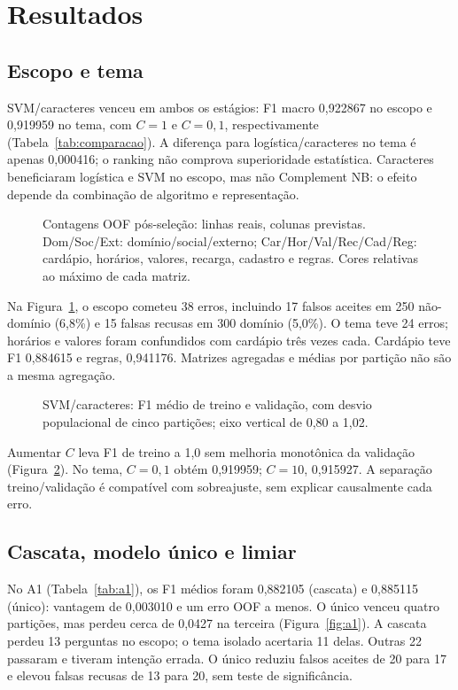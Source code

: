 \documentclass[12pt]{article}
\begin{document}
\section{Resultados}
\subsection{Escopo e tema}
SVM/caracteres venceu em ambos os estágios: F1 macro 0,922867 no escopo e
0,919959 no tema, com \(C=1\) e \(C=0{,}1\), respectivamente
(Tabela~\ref{tab:comparacao}). A diferença para logística/caracteres no tema é
apenas 0,000416; o ranking não comprova superioridade estatística.
Caracteres beneficiaram logística e SVM no escopo, mas não Complement NB:
o efeito depende da combinação de algoritmo e representação.


\begin{figure}[!htb]
\centering

\caption{Contagens OOF pós-seleção: linhas reais, colunas previstas.
Dom/Soc/Ext: domínio/social/externo; Car/Hor/Val/Rec/Cad/Reg: cardápio,
horários, valores, recarga, cadastro e regras. Cores relativas ao máximo de cada matriz.}
\label{fig:matrizes}
\end{figure}
Na Figura~\ref{fig:matrizes}, o escopo cometeu 38 erros, incluindo 17 falsos aceites em 250 não-domínio
(6,8\%) e 15 falsas recusas em 300 domínio (5,0\%). O tema teve 24 erros;
horários e valores foram confundidos com cardápio três vezes cada.
Cardápio teve F1 0,884615 e regras, 0,941176. Matrizes agregadas e médias
por partição não são a mesma agregação.

\begin{figure}[!htb]
\centering

\caption{SVM/caracteres: F1 médio de treino e validação, com desvio populacional
de cinco partições; eixo vertical de 0,80 a 1,02.}
\label{fig:curvas}
\end{figure}
Aumentar \(C\) leva F1 de treino a 1,0 sem melhoria monotônica da validação
(Figura~\ref{fig:curvas}). No tema, \(C=0{,}1\) obtém 0,919959;
\(C=10\), 0,915927. A separação treino/validação é compatível com sobreajuste,
sem explicar causalmente cada erro.

\subsection{Cascata, modelo único e limiar}

No A1 (Tabela~\ref{tab:a1}), os F1 médios foram 0,882105 (cascata) e 0,885115 (único):
vantagem de 0,003010 e um erro OOF a menos. O único venceu quatro partições,
mas perdeu cerca de 0,0427 na terceira (Figura~\ref{fig:a1}).
A cascata perdeu 13 perguntas no escopo; o tema isolado acertaria 11 delas.
Outras 22 passaram e tiveram intenção errada. O único reduziu falsos aceites
de 20 para 17 e elevou falsas recusas de 13 para 20, sem teste de significância.
\end{document}
